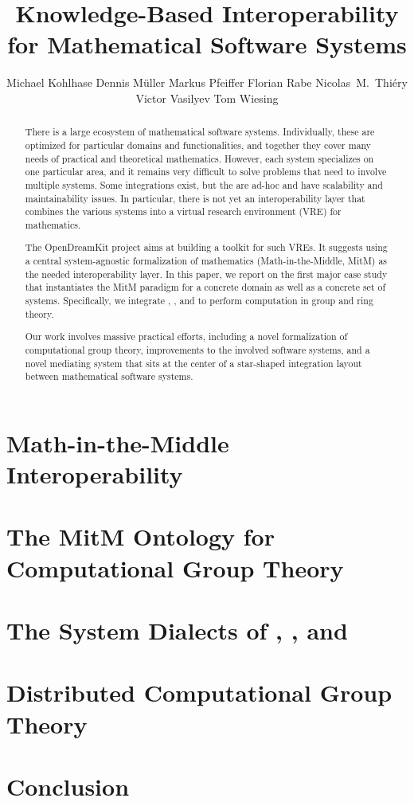 \documentclass{llncs}
\title{Knowledge-Based Interoperability for Mathematical Software Systems}
\author{
Michael Kohlhase\inst{1} 
Dennis M\"uller\inst{1} 
Markus Pfeiffer\inst{3} 
Florian Rabe\inst{2} 
Nicolas~M.~Thiéry\inst{4} 
Victor Vasilyev\inst{3} 
Tom Wiesing\inst{1}
}
\institute{
   FAU Erlangen-N\"urnberg
   \and Jacobs University Bremen
   \and University of St~Andrews 
   \and Universit\'e Paris-Sud
}
\begin{document}
\maketitle
\begin{abstract}
  There is a large ecosystem of mathematical software systems.
  Individually, these are optimized for particular domains and functionalities, and together they cover many needs of practical and theoretical mathematics.
  However, each system specializes on one particular area, and it remains very difficult to solve problems that need to involve multiple systems.
  Some integrations exist, but the are ad-hoc and have scalability and maintainability issues.
  In particular, there is not yet an interoperability layer that combines the various systems into a virtual research environment (VRE) for
  mathematics.
  
  The OpenDreamKit project aims at building a toolkit for such VREs.
  It suggests using a central system-agnostic formalization of mathematics (Math-in-the-Middle, MitM) as the needed interoperability layer.
  In this paper, we report on  the first major case study that instantiates the MitM paradigm for a concrete domain as well as a concrete set of systems.
  Specifically, we integrate \GAP, \Sage, and \Singular to perform computation in group and ring theory.
 
  Our work involves massive practical efforts, including a novel formalization of computational group theory, improvements to the involved software systems, and a novel mediating system that sits at the center of a star-shaped integration layout between mathematical software systems.
\end{abstract}


\section{Math-in-the-Middle Interoperability}\label{sec:mitm}


\section{The MitM Ontology for Computational Group Theory}\label{sec:cgt}


\section{The System Dialects of \GAP, \Sage, and \Singular}\label{sec:apit}


\section{Distributed Computational Group Theory}\label{sec:case}


\section{Conclusion}\label{sec:concl}
  
  
\printbibliography
\newpage
% 
\end{document}
